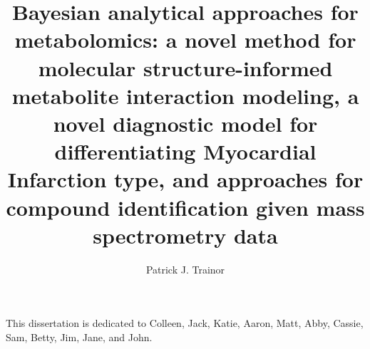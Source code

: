 \documentclass[final]{ulthesis}
\begin{document}
\author{Patrick J. Trainor}


\title{Bayesian analytical approaches for metabolomics: a novel method for molecular structure-informed metabolite interaction modeling, a novel diagnostic model for differentiating Myocardial Infarction type, and  approaches for compound identification given mass spectrometry data}









\frontmatter

\maketitle

\begin{dedication}
This dissertation is dedicated to Colleen, Jack, Katie, Aaron, Matt, Abby, Cassie, Sam, Betty, Jim, Jane, and John.
\end{dedication}
\end{document}
